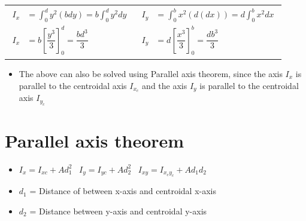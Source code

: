 \documentclass[8pt]{report}
\begin{document}
		\begin{table}[H]
				\centering
				\begin{tabular}{c|c}
					{$\begin{aligned}
					I_x &= \int_{0}^{d}y^2(bdy) = b\int_0^{d}y^2dy\\
					I_x &= b\left[\dfrac{y^3}{3}\right]_0^{d} = \dfrac{bd^3}{3}
					\end{aligned}$}&
					
					{$\begin{aligned}
					I_y &= \int_{0}^{b}x^2(d(dx)) = d\int_{0}^{b}x^2dx \\
					I_y &= d\left[\dfrac{x^3}{3}\right]_0^{b} = \dfrac{db^3}{3}
					\end{aligned}$}
				\end{tabular}
		\end{table}
		\begin{itemize}
			\item The above can also be solved using Parallel axis theorem, since the axis $I_x$ is parallel to the centroidal axis $I_{x_c}$ and the axis $I_y$ is parallel to the centroidal axis $I_{y_c}$
		\end{itemize}
	\section{Parallel axis theorem}
		\begin{itemize}
			\item $\boxed{I_x = I_{xc} + Ad_1^2}\;\;\;\boxed{I_y = I_{yc} + Ad_2^2}\;\;\;\boxed{I_{xy} = I_{x_cy_c}+Ad_1d_2}$ 
			\item $d_1$ = Distance of between x-axis and centroidal x-axis
			\item $d_2$ = Distance between y-axis and centroidal y-axis
		\end{itemize}\hrulefill
\end{document}
